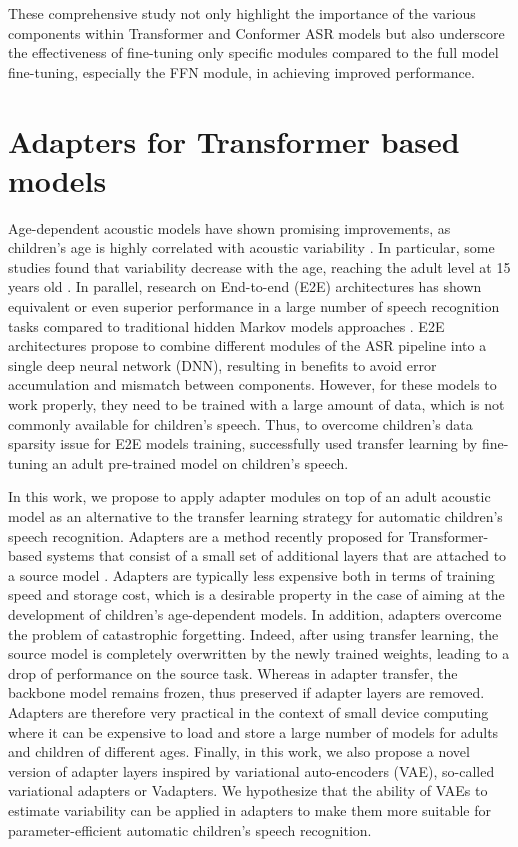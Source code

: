 These comprehensive study not only highlight the importance of the various components within Transformer and Conformer ASR models but also underscore the effectiveness of fine-tuning only specific modules compared to the full model fine-tuning, especially the FFN module, in achieving improved performance.


\section{Adapters for Transformer based models}

Age-dependent acoustic models have shown promising improvements, as children's age is highly correlated with acoustic variability \cite{children_language_model2, reviewASRchildren}. In particular, some studies found that variability decrease with the age, reaching the adult level at 15 years old \cite{Acoustic_change_children}.
In parallel, research on End-to-end (E2E) architectures has shown equivalent or even superior performance in a large number of speech recognition tasks compared to traditional hidden Markov models approaches \cite{hmm-end2end}. E2E architectures propose to combine different modules of the ASR pipeline into a single deep neural network (DNN), resulting in benefits to avoid error accumulation and mismatch between components.
However, for these models to work properly, they need to be trained with a large amount of data, which is not commonly available for children's speech. Thus, to overcome children's data sparsity issue for E2E models training, \cite{sri_end2end,gelin2021endtoend} successfully used transfer learning by fine-tuning an adult pre-trained model on children's speech.

In this work, we propose to apply adapter modules on top of an adult acoustic model as an alternative to the transfer learning strategy for automatic children's speech recognition. Adapters are a method recently proposed for Transformer-based systems that consist of a small set of additional layers that are attached to a source model \cite{houlsby,pfeiffer}. Adapters are typically less expensive both in terms of training speed and storage cost, which is a desirable property in the case of aiming at the development of children's age-dependent models.  In addition, adapters overcome the problem of catastrophic forgetting. Indeed, after using transfer learning, the source model is completely overwritten by the newly trained weights, leading to a drop of performance on the source task. Whereas in adapter transfer, the backbone model remains frozen, thus preserved if adapter layers are removed. Adapters are therefore very practical in the context of small device computing where it can be expensive to load and store a large number of models for adults and children of different ages. Finally, in this work, we also propose a novel version of adapter layers inspired by variational auto-encoders (VAE)\cite{VAE}, so-called variational adapters or Vadapters. We hypothesize that the ability of VAEs to estimate variability can be applied in adapters to make them more suitable for parameter-efficient automatic children's speech recognition.



